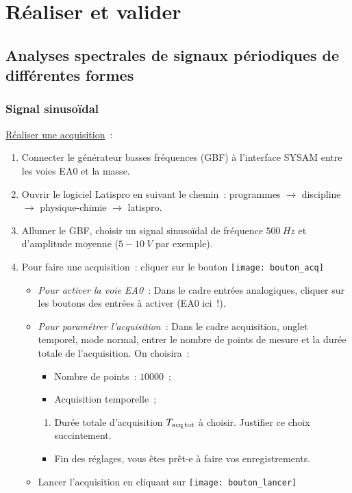 \documentclass[a4paper, 11pt, final, garamond]{book}
\begin{document}
\section{Réaliser et valider}
\subsection{Analyses spectrales de signaux périodiques de différentes formes}
\subsubsection{Signal sinusoïdal}

\underline{Réaliser une acquisition}~: \bigbreak
\begin{enumerate}
    \item Connecter le générateur basses fréquences (GBF) à l'interface SYSAM
        entre les voies EA0 et la masse.
    \item Ouvrir le logiciel Latispro en suivant le chemin~: programmes
        $\rightarrow$ discipline $\rightarrow$ physique-chimie $\rightarrow$
        latispro.
    \item Allumer le GBF, choisir un signal sinusoïdal de fréquence
        $\SI{500}{Hz}$ et d'amplitude moyenne ($5-\SI{10}{V}$ par exemple).
    \item Pour faire une acquisition~: cliquer sur le bouton
        \texttt{[image: bouton\_acq]}
        \begin{itemize}
            \item \textit{Pour activer la voie EA0}~: Dans le cadre entrées
                analogiques, cliquer sur les boutons des entrées à activer (EA0
                ici~!).
            \item \textit{Pour paramétrer l'acquisition}~: Dans le cadre
                acquisition, onglet temporel, mode normal, entrer le nombre de
                points de mesure et la durée totale de l'acquisition. On
                choisira~:
                \begin{itemize}
                    \item Nombre de points~: $\num{10 000}$~;
                    \item Acquisition temporelle~; 
                \end{itemize}
                \begin{enumerate}[label=\sqenumi]
                    \item Durée totale d'acquisition $T_{\rm acq\, tot}$ à
                        choisir. Justifier ce choix succintement. 
                \end{enumerate}
                \begin{itemize}
                    \item Fin des réglages, vous êtes prêt-e à faire vos
                        enregistrements.
                \end{itemize}
            \item Lancer l'acquisition en cliquant sur
                \texttt{[image: bouton\_lancer]}
        \end{itemize}
\end{enumerate} \bigbreak
\end{document}

